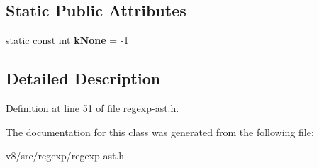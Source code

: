 \subsection*{Static Public Attributes}
\begin{DoxyCompactItemize}
\item 
\mbox{\label{classv8_1_1internal_1_1Interval_a2927ae1d5748bc5d2313327d78dec69e}} 
static const \mbox{\hyperlink{classint}{int}} {\bfseries k\+None} = -\/1
\end{DoxyCompactItemize}


\subsection{Detailed Description}


Definition at line 51 of file regexp-\/ast.\+h.



The documentation for this class was generated from the following file\+:\begin{DoxyCompactItemize}
\item 
v8/src/regexp/regexp-\/ast.\+h\end{DoxyCompactItemize}

